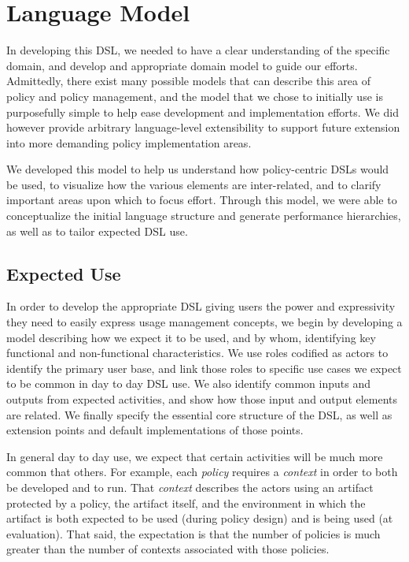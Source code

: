 \section{Language Model}\label{sec:model}
In developing this DSL, we needed to have a clear understanding of the specific domain, and develop and appropriate domain model to guide our efforts.  Admittedly, there exist many possible models that can describe this area of policy and policy management, and the model that we chose to initially use is purposefully simple to help ease development and implementation efforts.  We did however provide arbitrary language-level extensibility to support future extension into more demanding policy implementation areas.

We developed this model to help us understand how policy-centric DSLs would be used, to visualize how the various elements are inter-related, and to clarify important areas upon which to focus effort.  Through this model, we were able to conceptualize the initial language structure and generate performance hierarchies, as well as to tailor expected DSL use.

\subsection{Expected Use}
In order to develop the appropriate DSL giving users the power and expressivity they need to easily express usage management concepts, we begin by developing a model describing how we expect it to be used, and by whom, identifying key functional and non-functional characteristics.  We use roles codified as actors to identify the primary user base, and link those roles to specific use cases we expect to be common in day to day DSL use.  We also identify common inputs and outputs from expected activities, and show how those input and output elements are related.  We finally specify the essential core structure of the DSL, as well as extension points and default implementations of those points.

In general day to day use, we expect that certain activities will be much more common that others.  For example, each \textit{policy} requires a \textit{context} in order to both be developed and to run.  That \textit{context} describes the actors using an artifact protected by a policy, the artifact itself, and the environment in which the artifact is both expected to be used (during policy design) and is being used (at evaluation).  That said, the expectation is that the number of policies is much greater than the number of contexts associated with those policies.


